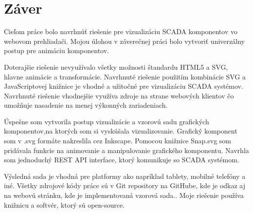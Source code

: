 \chapter*{Záver}

Cieľom práce bolo navrhnúť riešenie pre vizualizáciu SCADA komponentov vo webovom prehliadači. Mojou úlohou v záverečnej práci bolo vytvoriť univerzálny postup pre animáciu komponentov. 

Doterajšie riešenie nevyužívalo všetky možnosti štandardu HTML5 a SVG, hlavne animácie a transformácie. Navrhnuté riešenie použitím kombinácie SVG a JavaScriptovej knižnice je vhodné a užitočné pre vizualizáciu SCADA systémov. Navrhnuté riešenie vhodnejšie využíva zdroje na strane webových klientov čo umožňuje nasadenie na menej výkonných zariadeniach. 



Úspešne som vytvorila postup vizualizácie a vzorovú sadu grafických komponentov,na ktorých som si vyskúšala vizualizovanie. 
Grafický komponent som v .svg formáte nakreslila cez Inkscape. Pomocou knižnice Snap.svg som pridávala funkcie na animovanie a manipulovanie grafického komponentu. Navrhla som jednoduchý REST API interface, ktorý komunikuje so SCADA systémom. 

Výsledná sada je vhodná pre platformy ako napríklad tablety, mobilné telefóny a iné. 
Všetky zdrojové kódy práce sú v Git repository na GitHube\cite{github}, kde je odkaz aj na webovú stránku, kde je implementovaná vzorová sada..  Moje riešenie používa knižnicu a softvér, ktorý sú open-source.
